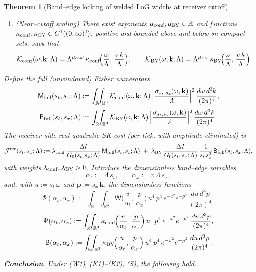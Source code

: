 \documentclass[10pt]{article}
\theoremstyle{definition}
\theoremstyle{plain}
\newtheorem{theorem}{Theorem}[section]
\begin{document}
\begin{theorem}[Band–edge locking of welded LoG widths at receiver cutoff]
\begin{enumerate}
\item[(S)] (\emph{Near–cutoff scaling}) There exist exponents $\mu_{\rm conf},\mu_{\rm BY}\in\mathbb R$ and functions
$\kappa_{\rm conf},\kappa_{\rm BY}\in C^1((0,\infty)^2)$, positive and bounded above and below on compact sets, such that
\[
\mathcal K_{\rm conf}(\omega,\mathbf k;\Lambda)
=\Lambda^{\mu_{\rm conf}}\,
\kappa_{\rm conf}\!\Big(\frac{\omega}{\Lambda},\,\frac{v\,k}{\Lambda}\Big),\qquad
\mathcal K_{\rm BY}(\omega,\mathbf k;\Lambda)
=\Lambda^{\mu_{\rm BY}}\,
\kappa_{\rm BY}\!\Big(\frac{\omega}{\Lambda},\,\frac{v\,k}{\Lambda}\Big).
\]
\end{enumerate}
Define the \emph{full} (unwindowed) Fisher numerators
\[
\mathsf M_{\rm full}(s_t,s_x;\Lambda)
:=\int_{\mathbb R}\!\!\int_{\mathbb R^3}
\mathcal K_{\rm conf}(\omega,\mathbf k;\Lambda)\,\Big|\frac{\sigma_{s_t,s_x}(\omega,\mathbf k)}{A}\Big|^2\,
\frac{d\omega\,d^3k}{(2\pi)^4},
\]
\[
\mathsf B_{\rm full}(s_t,s_x;\Lambda)
:=\int_{\mathbb R}\!\!\int_{\mathbb R^3}
\mathcal K_{\rm BY}(\omega,\mathbf k;\Lambda)\,\Big|\frac{\sigma_{s_t,s_x}(\omega,\mathbf k)}{A}\Big|^2\,
\frac{d\omega\,d^3k}{(2\pi)^4}.
\]
The receiver–side real quadratic SK cost (per tick, with amplitude eliminated) is
\begin{equation}
\label{eq:Jrec_def}
\mathcal J^{\rm rec}(s_t,s_x;\Lambda)
:=\lambda_{\rm conf}\,\frac{\Delta I}{G_0(s_t,s_x;\Lambda)}\,\mathsf M_{\rm full}(s_t,s_x;\Lambda)
\;+\;\lambda_{\rm BY}\,\frac{\Delta I}{G_0(s_t,s_x;\Lambda)}\,\frac{1}{s_t\,s_x^3}\,
\mathsf B_{\rm full}(s_t,s_x;\Lambda),
\end{equation}
with weights $\lambda_{\rm conf},\lambda_{\rm BY}>0$. Introduce the dimensionless band–edge variables
\[
\alpha_t:=\Lambda\,s_t,\qquad \alpha_x:=v\,\Lambda\,s_x,
\]
and, with $u:=s_t\,\omega$ and $\mathbf p:=s_x\,\mathbf k$, the dimensionless functions
\[
\Phi(\alpha_t,\alpha_x)
:=\int_{\mathbb R}\!\!\int_{\mathbb R^3}
\mathsf W\!\Big(\frac{u}{\alpha_t},\,\frac{p}{\alpha_x}\Big)\,
u^4\,p^4\,e^{-u^2}e^{-p^2}\,\frac{du\,d^3p}{(2\pi)^4},
\]
\[
\Psi(\alpha_t,\alpha_x)
:=\int_{\mathbb R}\!\!\int_{\mathbb R^3}
\kappa_{\rm conf}\!\Big(\frac{u}{\alpha_t},\,\frac{p}{\alpha_x}\Big)\,
u^4\,p^4\,e^{-u^2}e^{-p^2}\,\frac{du\,d^3p}{(2\pi)^4},
\]
\[
\mathsf B(\alpha_t,\alpha_x)
:=\int_{\mathbb R}\!\!\int_{\mathbb R^3}
\kappa_{\rm BY}\!\Big(\frac{u}{\alpha_t},\,\frac{p}{\alpha_x}\Big)\,
u^4\,p^4\,e^{-u^2}e^{-p^2}\,\frac{du\,d^3p}{(2\pi)^4}.
\]

\noindent\textbf{Conclusion.}
Under (W1), (K1)–(K2), (S), the following hold.


\end{theorem}
\end{document}

